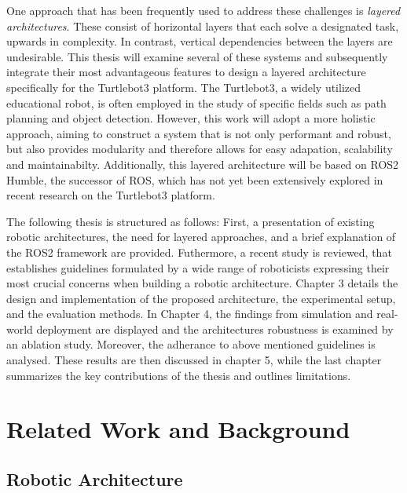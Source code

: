\documentclass[%
paper=A4,               %
twoside=true,           %
openright,              %
11pt,                   %
bibliography=totoc,     %
titlepage=on,           %
DIV=12,                 %
BCOR=1.5cm,             %
parskip=half,            %
final
]{scrreprt}
\begin{document}
	One approach that has been frequently used to address these challenges is \textit{layered architectures}. These consist of horizontal layers that each solve a designated task,  upwards in complexity. In contrast, vertical dependencies between the layers are undesirable. This thesis will examine several of these systems and subsequently integrate their most advantageous features to design a layered architecture specifically for the Turtlebot3 platform. The Turtlebot3, a widely utilized educational robot, is often employed in the study of specific fields such as path planning and object detection. However, this work will adopt a more holistic approach, aiming to construct a system that is not only performant and robust, but also provides modularity and therefore allows for easy adapation, scalability and maintainabilty. Additionally, this layered architecture will be based on ROS2 Humble, the successor of ROS, which has not yet been extensively explored in recent research on the Turtlebot3 platform.
	
	The following thesis is structured as follows: First, a presentation of existing robotic architectures, the need for layered approaches, and a brief explanation of the ROS2 framework are provided. Futhermore, a recent study is reviewed, that establishes guidelines formulated by a wide range of roboticists expressing their most crucial concerns when building a robotic architecture. Chapter 3 details the design and implementation of the proposed architecture, the experimental setup, and the evaluation methods. In Chapter 4, the findings from simulation and real-world deployment are displayed and the architectures robustness is examined by an ablation study. Moreover,  the adherance to above mentioned guidelines is analysed. \newline These results are then discussed in chapter 5, while the last chapter summarizes the key contributions of the thesis and outlines limitations.
	
	
	\chapter{Related Work and Background}
	\section{Robotic Architecture}
\end{document}
